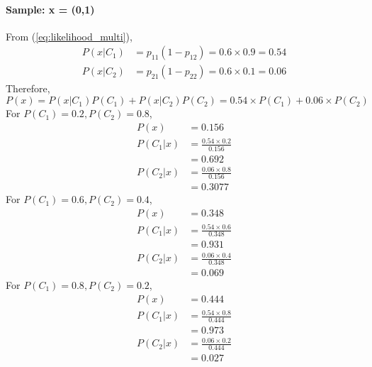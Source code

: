 \paragraph{Sample: x = (0,1)}
From (\ref{eq:likelihood_multi}),
\begin{equation*}
	\begin{split}
	P(x|C_1) &= p_{11}(1-p_{12}) = 0.6 \times 0.9 = 0.54\\
	P(x|C_2) &= p_{21}(1-p_{22}) = 0.6 \times 0.1 = 0.06
	\end{split}
\end{equation*}
Therefore,
\begin{equation}\label{eq:evidence_multi}
	P(x) = P(x|C_1)P(C_1) + P(x|C_2)P(C_2) = 0.54\times P(C_1) + 0.06 \times P(C_2)
\end{equation}
For $P(C_1) = 0.2, P(C_2) = 0.8$,
\begin{equation}
	\begin{split}
		P(x) &= 0.156\\
		P(C_1|x) &= \frac{0.54\times 0.2}{0.156}\\
		&= 0.692\\
		P(C_2|x) &= \frac{0.06 \times 0.8}{0.156}\\
		&= 0.3077
	\end{split}
\end{equation}
For $P(C_1) = 0.6, P(C_2) = 0.4$,
\begin{equation}
	\begin{split}
		P(x) &= 0.348\\
		P(C_1|x) &= \frac{0.54\times 0.6}{0.348}\\
		&= 0.931\\
		P(C_2|x) &= \frac{0.06 \times 0.4}{0.348}\\
		&= 0.069
	\end{split}
\end{equation}
For $P(C_1) = 0.8, P(C_2) = 0.2$,
\begin{equation}
	\begin{split}
		P(x) &= 0.444\\
		P(C_1|x) &= \frac{0.54\times 0.8}{0.444}\\
		&= 0.973\\
		P(C_2|x) &= \frac{0.06 \times 0.2}{0.444}\\
		&= 0.027
	\end{split}
\end{equation}
